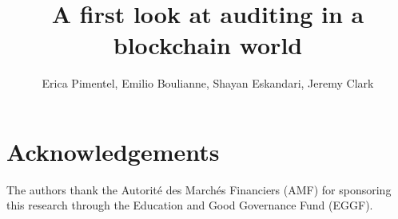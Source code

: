 \documentclass[envcountsect]{llncs}
\begin{document}
\frontmatter
\mainmatter

\title{\Large \bf A first look at auditing in a blockchain world}

\author{
	Erica Pimentel,
	Emilio Boulianne,
	Shayan Eskandari,
	Jeremy Clark
	}


\maketitle










\section{Acknowledgements}

The authors thank the Autorit\'e des March\'es Financiers (AMF) for sponsoring this research through the Education and Good Governance Fund (EGGF).





\clearpage
\appendix
\end{document}
